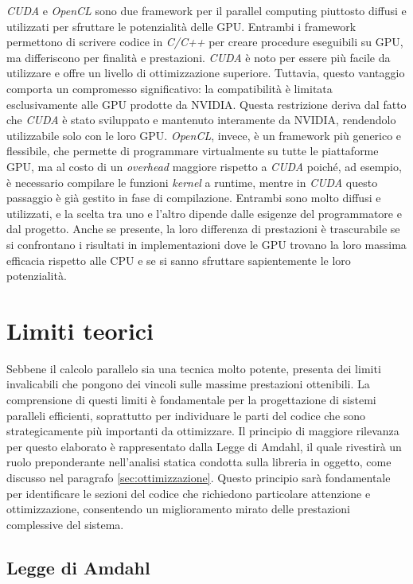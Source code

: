 \textit{CUDA} e \textit{OpenCL} sono due framework per il parallel computing
piuttosto diffusi e utilizzati per sfruttare le potenzialità delle GPU. Entrambi
i framework permettono di scrivere codice in \textit{C/C++} per creare procedure
eseguibili su GPU, ma differiscono per finalità e prestazioni. \textit{CUDA} è noto
per essere più facile da utilizzare e offre un livello di ottimizzazione superiore.
Tuttavia, questo vantaggio comporta un compromesso significativo: la
compatibilità è limitata esclusivamente alle GPU prodotte da NVIDIA. Questa restrizione
deriva dal fatto che \textit{CUDA} è stato sviluppato e mantenuto interamente da
NVIDIA, rendendolo utilizzabile solo con le loro GPU. \textit{OpenCL}, invece, è
un framework più generico e flessibile, che permette di programmare virtualmente
su tutte le piattaforme GPU, ma al costo di un \textit{overhead} maggiore
rispetto a \textit{CUDA} poiché, ad esempio, è necessario compilare le funzioni \textit{kernel}
a runtime, mentre in \textit{CUDA} questo passaggio è già gestito in fase di
compilazione. Entrambi sono molto diffusi e utilizzati, e la scelta tra uno e l'altro
dipende dalle esigenze del programmatore e dal progetto. Anche se presente, la
loro differenza di prestazioni è trascurabile se si confrontano i risultati in
implementazioni dove le GPU trovano la loro massima efficacia rispetto alle CPU
e se si sanno sfruttare sapientemente le loro potenzialità.

\section{Limiti teorici}
\label{sec:limititeorici}

Sebbene il calcolo parallelo sia una tecnica molto potente, presenta dei limiti
invalicabili che pongono dei vincoli sulle massime prestazioni ottenibili. La comprensione
di questi limiti è fondamentale per la progettazione di sistemi paralleli efficienti,
soprattutto per individuare le parti del codice che sono strategicamente più
importanti da ottimizzare. Il principio di maggiore rilevanza per questo elaborato
è rappresentato dalla Legge di Amdahl, il quale rivestirà un ruolo preponderante
nell'analisi statica condotta sulla libreria in oggetto, come discusso nel paragrafo
\ref{sec:ottimizzazione}. Questo principio sarà fondamentale per identificare le
sezioni del codice che richiedono particolare attenzione e ottimizzazione, consentendo
un miglioramento mirato delle prestazioni complessive del sistema.

\subsection{Legge di Amdahl}
\label{sec:amdahl}

